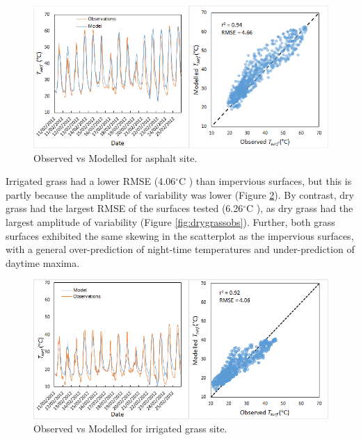 \documentclass[final,3p,times,authoryear]{elsarticle}
\newcommand{\degreeC}{\ensuremath{^\circ}C }
\begin{document}
\begin{figure}[!htbp]
\includegraphics[trim=0mm 0mm 0mm 0mm, clip,scale=0.88]{images/asphaltobs.png}
 \caption{Observed vs Modelled  for asphalt site.} \label{fig:asphaltobs}
\end{figure}
	


Irrigated grass had a lower RMSE (4.06\degreeC) than impervious surfaces, but this is partly because the amplitude of  variability was lower (Figure \ref{fig:irrgrassobs}).  By contrast, dry grass had the largest RMSE of the surfaces tested (6.26\degreeC), as dry grass had the largest amplitude of  variability (Figure \ref{fig:drygrassobs}). Further, both grass surfaces exhibited the same skewing in the scatterplot as the impervious surfaces, with a general over-prediction of night-time temperatures and under-prediction of daytime maxima. 



\begin{figure}[!htbp]
\includegraphics[trim=0mm 0mm 0mm 0mm, clip,scale=0.88]{images/irrgrassobs.png}
 \caption{Observed vs Modelled  for irrigated grass site.} \label{fig:irrgrassobs}
\end{figure}
\end{document}
